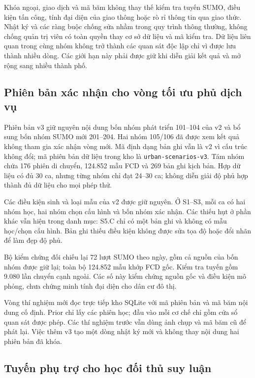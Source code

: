 Khóa ngoại, giao dịch và mã băm không thay thế kiểm tra tuyến SUMO, điều kiện tấn công, tính đại diện của giao thông hoặc rò rỉ thông tin qua giao thức. Nhật ký và các ràng buộc chống sửa nhầm trong quy trình thông thường, không chống quản trị viên có toàn quyền thay cơ sở dữ liệu và mã kiểm tra. Dữ liệu liên quan trong cùng nhóm không trở thành các quan sát độc lập chỉ vì được lưu thành nhiều dòng. Các giới hạn này phải được giữ khi diễn giải kết quả và mở rộng sang nhiều thành phố.

\subsection{Phiên bản xác nhận cho vòng tối ưu phủ dịch vụ}

Phiên bản v3 giữ nguyên nội dung bốn nhóm phát triển 101--104 của v2 và bổ sung bốn nhóm SUMO mới 201--204. Hai nhóm 105/106 đã được xem kết quả không tham gia xác nhận vòng mới. Mã định dạng bản ghi vẫn là v2 vì cấu trúc không đổi; mã phiên bản dữ liệu trong kho là \texttt{urban-scenarios-v3}. Tám nhóm chứa 176 phiên di chuyển, 124.852 mẫu FCD và 269 bản ghi kịch bản. Hợp dữ liệu có đủ 30 ca, nhưng từng nhóm chỉ đạt 24--30 ca; không diễn giải độ phủ hợp thành đủ dữ liệu cho mọi phép thử.

Các điều kiện sinh và loại mẫu của v2 được giữ nguyên. Ở S1--S3, mỗi ca có hai nhóm học, hai nhóm chọn cấu hình và bốn nhóm xác nhận. Các thiếu hụt ở phần khác vẫn hiện trong danh mục: S5.C chỉ có một bản ghi và không có mẫu học/chọn cấu hình. Bản ghi thiếu điều kiện không được sửa tọa độ hoặc đổi nhãn để làm đẹp độ phủ.

Bộ kiểm chứng đối chiếu lại 72 lượt SUMO theo ngày, gồm cả nguồn của bốn nhóm được giữ lại; toàn bộ 124.852 mẫu khớp FCD gốc. Kiểm tra tuyến gồm 9.080 lần chuyển cạnh ngoài. Các số này kiểm chứng nguồn gốc và điều kiện mô phỏng, chưa chứng minh tính đại diện cho dân cư đô thị.

Vòng thí nghiệm mới đọc trực tiếp kho SQLite với mã phiên bản và mã băm nội dung cố định. Prior chỉ lấy các phiên học; đầu vào mỗi cơ chế chỉ gồm cửa sổ quan sát được phép. Các thí nghiệm trước vẫn dùng ảnh chụp và mã băm cũ để phát lại. Việc thêm v3 tạo một dòng nhật ký mới và không thay nội dung hai phiên bản đã khóa.

\subsection{Tuyến phụ trợ cho học đối thủ suy luận}
\label{sec:auxiliary-shadow-data}

